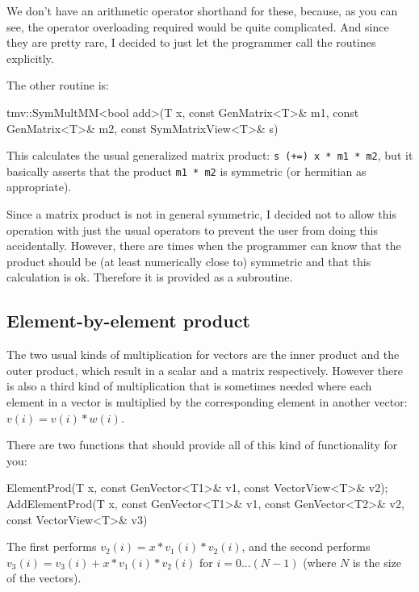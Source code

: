 \documentclass[twoside,letterpaper,11pt]{article}
\renewcommand{\tt}[1]{{\lstinline {#1}}}
\begin{document}
We don't have an arithmetic operator 
shorthand for these, because, as you can see, the operator
overloading required would be quite complicated.  
And since they are pretty rare, I decided to just let the programmer 
call the routines explicitly.

The other routine is:
\begin{tmvcode}
tmv::SymMultMM<bool add>(T x, const GenMatrix<T>& m1, 
      const GenMatrix<T>& m2, const SymMatrixView<T>& s)
\end{tmvcode}
This calculates the usual generalized matrix product:
\tt{s (+=) x * m1 * m2}, but it basically
asserts that the product \tt{m1 * m2} is symmetric (or hermitian as appropriate).

Since a matrix product is not in general symmetric, I decided not to allow 
this operation with just the usual operators to prevent the user from doing 
this accidentally.  However, there are times when the 
programmer can know that the product should be (at least numerically close to)
symmetric and that this calculation is ok.  Therefore it is provided as a subroutine.

\subsection{Element-by-element product}
\label{ElementProd}

The two usual kinds of multiplication for vectors are the inner product and 
the outer product, which result in a scalar and a matrix respectively.
However there is also a third kind of multiplication that is sometimes needed where
each element in a vector is multiplied by the
corresponding element in another vector: $v(i) = v(i) * w(i)$.

There are two functions that should provide all of this kind of functionality
for you:
\begin{tmvcode}
ElementProd(T x, const GenVector<T1>& v1, const VectorView<T>& v2);
AddElementProd(T x, const GenVector<T1>& v1, const GenVector<T2>& v2,
      const VectorView<T>& v3)
\end{tmvcode}
The first performs $v_2(i) = x * v_1(i) * v_2(i)$, and the second performs
$v_3(i) = v_3(i) + x * v_1(i) * v_2(i)$ for $i = 0 ... (N-1)$ (where $N$ is the 
size of the vectors).
\end{document}
